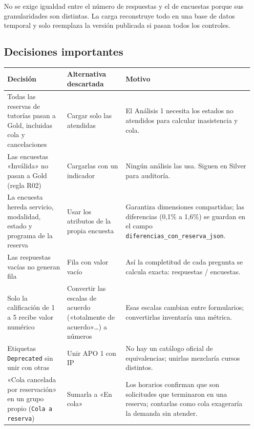 \documentclass[11pt,letterpaper]{article}
\begin{document}
No se exige igualdad entre el número de respuestas y el de encuestas porque sus granularidades son distintas. La carga reconstruye todo en una base de datos temporal y solo reemplaza la versión publicada si pasan todos los controles.

\subsection{Decisiones importantes}

\begingroup\small\setlength{\tabcolsep}{4pt}\renewcommand{\arraystretch}{1.15}
\begin{longtable}{>{\raggedright\arraybackslash}p{}>{\raggedright\arraybackslash}p{}>{\raggedright\arraybackslash}p{}}
\toprule
\textbf{Decisión} & \textbf{Alternativa descartada} & \textbf{Motivo} \\
\midrule
\endhead
Todas las reservas de tutorías pasan a Gold, incluidas cola y cancelaciones & Cargar solo las atendidas & El Análisis 1 necesita los estados no atendidos para calcular inasistencia y cola. \\
Las encuestas «Inválida» no pasan a Gold (regla R02) & Cargarlas con un indicador & Ningún análisis las usa. Siguen en Silver para auditoría. \\
La encuesta hereda servicio, modalidad, estado y programa de la reserva & Usar los atributos de la propia encuesta & Garantiza dimensiones compartidas; las diferencias (0,1\% a 1,6\%) se guardan en el campo \texttt{diferencias\_\allowbreak{}con\_\allowbreak{}reserva\_\allowbreak{}json}. \\
Las respuestas vacías no generan fila & Fila con valor vacío & Así la completitud de cada pregunta se calcula exacta: respuestas / encuestas. \\
Solo la calificación de 1 a 5 recibe valor numérico & Convertir las escalas de acuerdo («totalmente de acuerdo»\ldots{}) a números & Esas escalas cambian entre formularios; convertirlas inventaría una métrica. \\
Etiquetas \texttt{Deprecated} sin unir con otras & Unir APO 1 con IP & No hay un catálogo oficial de equivalencias; unirlas mezclaría cursos distintos. \\
«Cola cancelada por reservación» en un grupo propio (\texttt{Cola a reserva}) & Sumarla a «En cola» & Los horarios confirman que son solicitudes que terminaron en una reserva; contarlas como cola exageraría la demanda sin atender. \\

\end{longtable}
\end{document}
